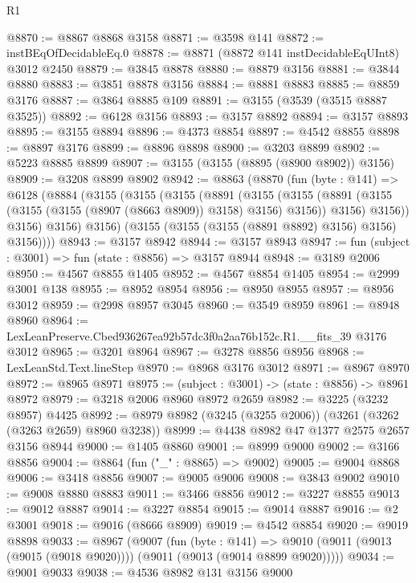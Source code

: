 \begin{lexlean}{R1}
\begin{coremodule}
@8870 := @8867 @8868 @3158
@8871 := @3598 @141
@8872 := instBEqOfDecidableEq.{0}
@8878 := @8871 (@8872 @141 instDecidableEqUInt8) @3012 @2450
@8879 := @3845 @8878
@8880 := @8879 @3156
@8881 := @3844 @8880
@8883 := @3851 @8878 @3156
@8884 := @8881 @8883
@8885 := @8859 @3176
@8887 := @3864 @8885 @109
@8891 := @3155 (@3539 (@3515 @8887 @3525))
@8892 := @6128 @3156
@8893 := @3157 @8892
@8894 := @3157 @8893
@8895 := @3155 @8894
@8896 := @4373 @8854
@8897 := @4542 @8855
@8898 := @8897 @3176
@8899 := @8896 @8898
@8900 := @3203 @8899
@8902 := @5223 @8885 @8899
@8907 := @3155 (@3155 (@8895 (@8900 @8902)) @3156)
@8909 := @3208 @8899 @8902
@8942 := @8863
    (@8870
      (fun (byte : @141) =>
      @6128
        (@8884
          (@3155
            (@3155
              (@3155
                (@8891
                  (@3155
                    (@3155
                      (@8891 (@3155 (@3155 (@3155 (@8907 (@8663 @8909)) @3158) @3156) @3156))
                      @3156)
                    @3156))
                @3156)
              @3156)
            @3156)
          (@3155 (@3155 (@3155 (@8891 @8892) @3156) @3156) @3156))))
@8943 := @3157 @8942
@8944 := @3157 @8943
@8947 := fun (subject : @3001) => fun (state : @8856) => @3157 @8944
@8948 := @3189 @2006
@8950 := @4567 @8855 @1405
@8952 := @4567 @8854 @1405
@8954 := @2999 @3001 @138
@8955 := @8952 @8954
@8956 := @8950 @8955
@8957 := @8956 @3012
@8959 := @2998 @8957 @3045
@8960 := @3549 @8959
@8961 := @8948 @8960
@8964 := LexLeanPreserve.Cbed936267ea92b57dc3f0a2aa76b152c.R1.__fits_39 @3176 @3012
@8965 := @3201 @8964
@8967 := @3278 @8856 @8956
@8968 := LexLeanStd.Text.lineStep
@8970 := @8968 @3176 @3012
@8971 := @8967 @8970
@8972 := @8965 @8971
@8975 := (subject : @3001) -> (state : @8856) -> @8961 @8972
@8979 := @3218 @2006 @8960 @8972 @2659
@8982 := @3225 (@3232 @8957) @4425
@8992 := @8979 @8982 (@3245 (@3255 @2006)) (@3261 (@3262 (@3263 @2659) @8960 @3238))
@8999 := @4438 @8982 @47 @1377 @2575 @2657 @3156 @8944
@9000 := @1405 @8860
@9001 := @8999 @9000
@9002 := @3166 @8856
@9004 := @8864 (fun ("_" : @8865) => @9002)
@9005 := @9004 @8868
@9006 := @3418 @8856
@9007 := @9005 @9006
@9008 := @3843 @9002
@9010 := @9008 @8880 @8883
@9011 := @3466 @8856
@9012 := @3227 @8855
@9013 := @9012 @8887
@9014 := @3227 @8854
@9015 := @9014 @8887
@9016 := @2 @3001
@9018 := @9016 (@8666 @8909)
@9019 := @4542 @8854
@9020 := @9019 @8898
@9033 := @8967
    (@9007
      (fun (byte : @141) =>
      @9010 (@9011 (@9013 (@9015 (@9018 @9020)))) (@9011 (@9013 (@9014 @8899 @9020)))))
@9034 := @9001 @9033
@9038 := @4536 @8982 @131 @3156 @9000

\end{coremodule}
\end{lexlean}
